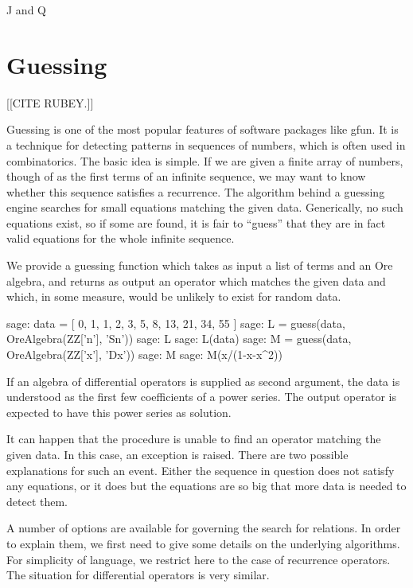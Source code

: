 \documentclass{amsart}
\begin{document}
J and Q

\section{Guessing}\label{sec:5}

[[CITE RUBEY.]]

Guessing is one of the most popular features of software packages like gfun.  It
is a technique for detecting patterns in sequences of numbers, which is often
used in combinatorics. The basic idea is simple. If we are given a finite array
of numbers, though of as the first terms of an infinite sequence, we may want to
know whether this sequence satisfies a recurrence. The algorithm behind a
guessing engine searches for small equations matching the given data.
Generically, no such equations exist, so if some are found, it is fair to
``guess'' that they are in fact valid equations for the whole infinite sequence.

We provide a guessing function which takes as input a list of terms and an Ore
algebra, and returns as output an operator which matches the given data and
which, in some measure, would be unlikely to exist for random data.

\begin{sageexample}
  sage: data = [ 0, 1, 1, 2, 3, 5, 8, 13, 21, 34, 55 ]
  sage: L = guess(data, OreAlgebra(ZZ['n'], 'Sn'))
  sage: L
  sage: L(data)
  sage: M = guess(data, OreAlgebra(ZZ['x'], 'Dx'))
  sage: M
  sage: M(x/(1-x-x^2))
\end{sageexample}

If an algebra of differential operators is supplied as second argument, the data
is understood as the first few coefficients of a power series. The output
operator is expected to have this power series as solution.

It can happen that the procedure is unable to find an operator matching the 
given data. In this case, an exception is raised. There are two possible 
explanations for such an event. Either the sequence in question does not 
satisfy any equations, or it does but the equations are so big that more
data is needed to detect them. 

A number of options are available for governing the search for relations.  In
order to explain them, we first need to give some details on the underlying
algorithms. For simplicity of language, we restrict here to the case of
recurrence operators. The situation for differential operators is very similar.
\end{document}
